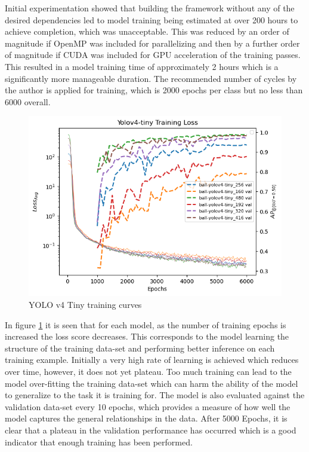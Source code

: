 \documentclass[a4paper,twoside,12pt]{report}
\begin{document}
Initial experimentation showed that building the framework without any of the desired dependencies led to model training being estimated at over 200 hours to achieve completion, which was unacceptable. This was reduced by an order of magnitude if OpenMP was included for parallelizing and then by a further order of magnitude if CUDA was included for GPU acceleration of the training passes. This resulted in a model training time of approximately 2 hours which is a significantly more manageable duration. The recommended number of cycles by the author is applied for training, which is 2000 epochs per class but no less than 6000 overall.

\begin{figure}[h!]
\begin{center}
\includegraphics[width=13cm]{images/yolov4tiny_train.png}
\caption{YOLO v4 Tiny training curves}
\label{fig:yolov4tiny_train}
\end{center}
\end{figure}

In figure \ref{fig:yolov4tiny_train} it is seen that for each model, as the number of training epochs is increased the loss score decreases. This corresponds to the model learning the structure of the training data-set and performing better inference on each training example. Initially a very high rate of learning is achieved which reduces over time, however, it does not yet plateau. Too much training can lead to the model over-fitting the training data-set which can harm the ability of the model to generalize to the task it is training for. The model is also evaluated against the validation data-set every 10 epochs, which provides a measure of how well the model captures the general relationships in the data. After 5000 Epochs, it is clear that a plateau in the validation performance has occurred which is a good indicator that enough training has been performed. 
\end{document}
